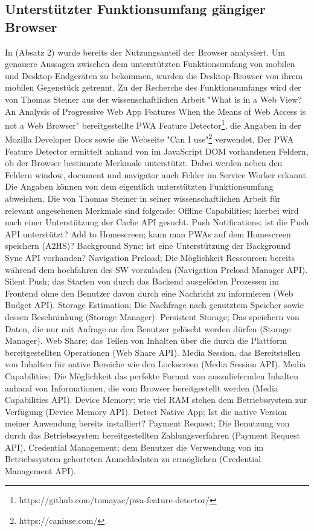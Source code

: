\subsection{Unterstützter Funktionsumfang gängiger Browser}
\label{subsec:unterstuetzterfunktionsumfanggaengigerbrowser}
In  (Absatz 2) wurde bereits der Nutzungsanteil der Browser analysiert. Um genauere Aussagen zwischen
dem unterstützten Funktionsumfang von mobilen und Desktop-Endgeräten zu bekommen, wurden die Desktop-Browser von ihrem mobilen
Gegenstück getrennt. Zu der Recherche des Funktionsumfangs wird der von Thomas Steiner aus der wissenschaftlichen Arbeit "What is
in a Web View? An Analysis of Progressive Web App Features When the Means of Web Access is not a Web Browser" bereitgestellte
PWA Feature Detector\footnote{https://github.com/tomayac/pwa-feature-detector/}, die Angaben in der Mozilla Developer Docs sowie 
die Webseite "Can I use"\footnote{https://caniuse.com/} verwendet. Der PWA Feature Detector ermittelt anhand von im JavaScript
DOM vorhandenen Feldern, ob der Browser bestimmte Merkmale unterstützt. Dabei werden neben den Feldern window, document und navigator
auch Felder im Service Worker erkannt. Die Angaben können von dem eigentlich unterstützten Funktionsumfang abweichen. Die von Thomas
Steiner in seiner wissenschaftlichen Arbeit für relevant angesehenen Merkmale sind folgende: Offline Capabilities; hierbei wird nach
einer Unterstützung der Cache API gesucht. Push Notifications; ist die Push API unterstützt? Add to Homescreen; kann man PWAs auf
dem Homescreen speichern (A2HS)? Background Sync; ist eine Unterstützung der Background Sync API vorhanden? Navigation Preload; Die Möglichkeit
Ressourcen bereits während dem hochfahren des SW vorzuladen (Navigation Preload Manager API). Silent Push; das Starten von durch das
Backend ausgelösten Prozessen im Frontend ohne den Benutzer davon durch eine Nachricht zu informieren (Web Budget API). 
Storage Estimation; Die Nachfrage nach genutztem Speicher sowie dessen Beschränkung (Storage Manager). Persistent Storage;
Das speichern von Daten, die nur mit Anfrage an den Benutzer gelöscht werden dürfen (Storage Manager). Web Share; das Teilen von Inhalten
über die durch die Plattform bereitgestellten Operationen (Web Share API). Media Session, das Bereitstellen von Inhalten für native
Bereiche wie den Lockscreen (Media Session API). Media Capabilities; Die Möglichkeit das perfekte Format von auszuliefernden Inhalten anhand von
Informationen, die vom Browser bereitgestellt werden (Media Capabilities API). Device Memory; wie viel RAM stehen dem Betriebssystem zur
Verfügung (Device Memory API). Detect Native App; Ist die native Version meiner Anwendung bereits installiert? Payment Request;
Die Benutzung von durch das Betriebssystem bereitgestellten Zahlungsverfahren (Payment Request API). Credential Management;
dem Benutzer die Verwendung von im Betriebssystem gehorteten Anmeldedaten zu ermöglichen (Credential Management API).\cite[Abschnitt 2.3]{WhatIsInAWebView}

